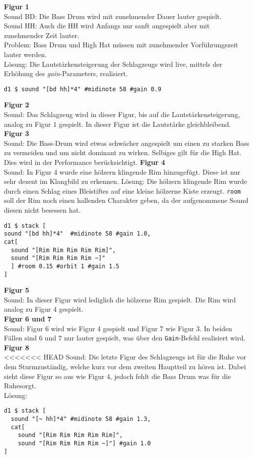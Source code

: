 \documentclass[
10pt, %
a4paper, %
oneside, %
headinclude,footinclude, %
BCOR5mm, %
]{scrartcl}
\begin{document}
\noindent \textbf{Figur 1}\\
Sound BD: Die Bass Drum wird mit zunehmender Dauer lauter gespielt.\\
Sound HH: Auch die HH wird Anfangs nur sanft angespielt aber mit zunehmender Zeit lauter.\\
Problem: Bass Drum und High Hat müssen mit zunehmender Vorführungszeit lauter werden.\\ 
Lösung: Die Lautstärkensteigerung der Schlagzeugs wird live, mittels der Erhöhung des \textit{gain}-Parameters, realisiert.
\begin{lstlisting}
d1 $ sound "[bd hh]*4" #midinote 58 #gain 0.9
\end{lstlisting}
\noindent \textbf{Figur 2}\\
Sound: Das Schlagzeug wird in dieser Figur, bis auf die Lautstärkensteigerung, analog zu Figur 1 gespielt. In dieser Figur ist die Lautstärke gleichbleibend.\\
\noindent \textbf{Figur 3}\\
Sound: Die Bass-Drum wird etwas schwächer angespielt um einen zu starken Bass zu vermeiden und um nicht dominant zu wirken. Selbiges gilt für die High Hat. Dies wird in der Performance berücksichtigt.
\noindent \textbf{Figur 4}\\
Sound: In Figur 4 wurde eine hölzern klingende Rim hinzugefügt. Diese ist nur sehr dezent im Klangbild zu erkennen.
Lösung: Die hölzern klingende Rim wurde durch einen Schlag eines Bleistiftes auf eine kleine hölzerne Kiste erzeugt. \verb|room| soll der Rim noch einen hallenden Charakter geben, da der aufgenommene Sound diesen nicht besessen hat.
 \begin{lstlisting}
d1 $ stack [
sound "[bd hh]*4"  #midinote 58 #gain 1.0,
cat[
  sound "[Rim Rim Rim Rim Rim]",
  sound "[Rim Rim Rim Rim ~]"
  ] #room 0.15 #orbit 1 #gain 1.5
]
\end{lstlisting}
\noindent \textbf{Figur 5}\\
Sound: In dieser Figur wird lediglich die hölzerne Rim gespielt. Die Rim wird analog zu Figur 4 gespielt.\\
\noindent \textbf{Figur 6 und 7}\\
Sound: Figur 6 wird wie Figur 4 gespielt und Figur 7 wie Figur 3. In beiden Fällen sind 6 und 7 nur lauter gespielt, was über den \verb|Gain|-Befehl realisiert wird.\\
\noindent \textbf{Figur 8}\\
<<<<<<< HEAD
Sound: Die letzte Figur des Schlagzeugs ist für \grqq die Ruhe vor dem Sturm\grqq zuständig, welche kurz vor dem zweiten Hauptteil zu hören ist. Dabei sieht diese Figur so aus
wie Figur 4, jedoch fehlt die Bass Drum was für die \grqq Ruhe\grqq sorgt.\\
Lösung:
\begin{lstlisting}
d1 $ stack [
  sound "[~ hh]*4" #midinote 58 #gain 1.3,
  cat[
    sound "[Rim Rim Rim Rim Rim]",
    sound "[Rim Rim Rim Rim ~]"] #gain 1.0
]
\end{lstlisting}
\end{document}
